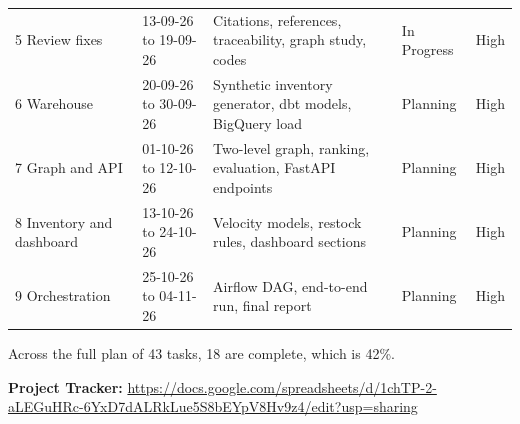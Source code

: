 \documentclass[11pt,a4paper]{article}
\begin{document}
\begin{longtable}{@{}p{2.5cm}p{2.5cm}p{6.4cm}p{2.0cm}p{1.6cm}@{}}
5 Review fixes & 13-09-26 to 19-09-26 & Citations, references, traceability, graph study, codes & In Progress & High \\
6 Warehouse & 20-09-26 to 30-09-26 & Synthetic inventory generator, dbt models, BigQuery load & Planning & High \\
7 Graph and API & 01-10-26 to 12-10-26 & Two-level graph, ranking, evaluation, FastAPI endpoints & Planning & High \\
8 Inventory and dashboard & 13-10-26 to 24-10-26 & Velocity models, restock rules, dashboard sections & Planning & High \\
9 Orchestration & 25-10-26 to 04-11-26 & Airflow DAG, end-to-end run, final report & Planning & High \\
\end{longtable}

\noindent\footnotesize Across the full plan of 43 tasks, 18 are complete, which is 42\%.

\vspace{8pt}
\noindent\small\textbf{Project Tracker:}
\url{https://docs.google.com/spreadsheets/d/1chTP-2-aLEGuHRc-6YxD7dALRkLue5S8bEYpV8Hv9z4/edit?usp=sharing}
\end{document}
